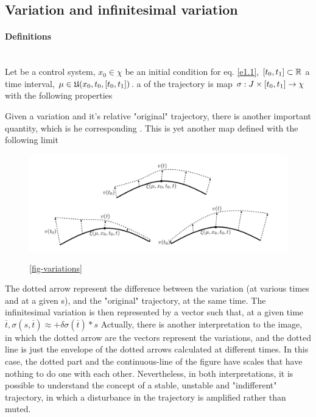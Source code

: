 \subsection{Variation and infinitesimal variation}
\paragraph{Definitions}\mbox{}\\
Let \controlSystem be a control system, $x_0\in\chi$ be an initial condition for eq. \ref{e1.1}, $[t_0,t_1]\subset\mathbb{R}$ a time interval, $\mu\in\mathfrak{U}(x_0,t_0,[t_0,t_1])$. a  of the trajectory \trajWinCond{\cdot} is map $\sigma:J\times[t_0,t_1]\rightarrow\chi$ with the following properties 

Given a variation and it's relative "original" trajectory, there is another important quantity, which is he corresponding . This is yet another map defined with the following limit
\begin{figure}[H]
	\includegraphics[width=\linewidth]{imgs/variations.png}
	\caption{}
	\ref{fig-variations}
\end{figure}
The dotted arrow represent the difference between the variation (at various times and at a given s), and the "original" trajectory, at the same time. The infinitesimal variation is then represented by a vector such that, at a given time $\overline{t},\sigma(s,\overline{t})\approx$$+\delta\sigma(\overline{t})*s$
Actually, there is another interpretation to the image, in which the dotted arrow are the vectors represent the  variations, and the dotted line is just the envelope of the dotted arrows calculated at different times. In this case, the dotted part and the continuous-line of the figure have scales that have nothing to do one with each other. Nevertheless, in both interpretations, it is possible to understand the concept of a stable, unstable and "indifferent" trajectory, in which a disturbance in the trajectory is amplified rather than muted.
